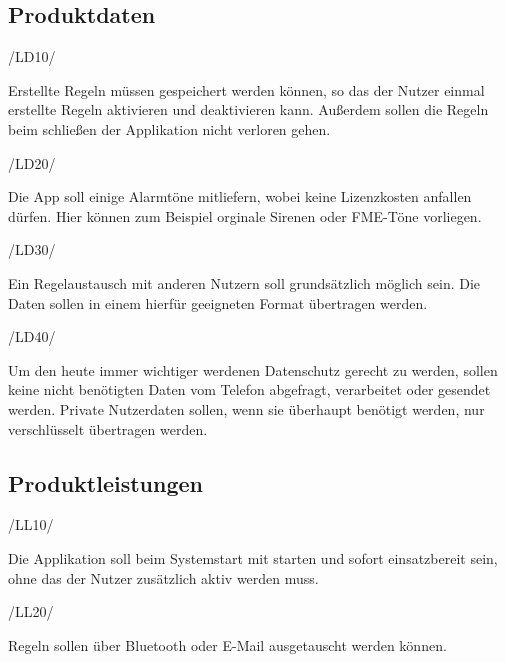 \subsection{Produktdaten}
\begin{minipage}{3cm}
/LD10/
\end{minipage}
\begin{minipage}{13cm}
Erstellte Regeln m\"ussen gespeichert werden k\"onnen, so das der Nutzer einmal erstellte Regeln aktivieren und deaktivieren kann. Au\ss{}erdem sollen die Regeln beim schlie\ss{}en der Applikation nicht verloren gehen.\\
\end{minipage}
\begin{minipage}{3cm}
/LD20/
\end{minipage}
\begin{minipage}{13cm}
Die App soll einige Alarmt\"one mitliefern, wobei keine Lizenzkosten anfallen d\"urfen. Hier k\"onnen zum Beispiel orginale Sirenen oder \ac{FME}-T\"one vorliegen.\\
\end{minipage}
\begin{minipage}{3cm}
/LD30/
\end{minipage}
\begin{minipage}{13cm}
Ein Regelaustausch mit anderen Nutzern soll grunds\"atzlich m\"oglich sein. Die Daten sollen in einem hierf\"ur geeigneten Format \"ubertragen werden.\\
\end{minipage}
\begin{minipage}{3cm}
/LD40/
\end{minipage}
\begin{minipage}{13cm}
Um den heute immer wichtiger werdenen Datenschutz gerecht zu werden, sollen keine nicht ben\"otigten Daten vom Telefon abgefragt, verarbeitet oder gesendet werden. Private Nutzerdaten sollen, wenn sie \"uberhaupt ben\"otigt werden, nur verschl\"usselt \"ubertragen werden.\\
\end{minipage}

\subsection{Produktleistungen}
\begin{minipage}{3cm}
/LL10/
\end{minipage}
\begin{minipage}{13cm}
Die Applikation soll beim Systemstart mit starten und sofort einsatzbereit sein, ohne das der Nutzer zus\"atzlich aktiv werden muss.\\
\end{minipage}
\begin{minipage}{3cm}
/LL20/
\end{minipage}
\begin{minipage}{13cm}
Regeln sollen \"uber Bluetooth oder E-Mail ausgetauscht werden k\"onnen.\\
\end{minipage}